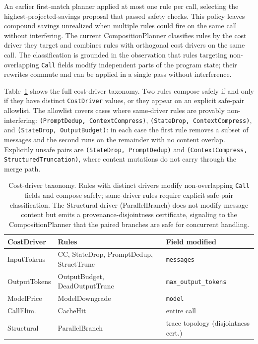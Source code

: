 \documentclass[sigconf,9pt]{acmart}
\begin{document}
An earlier first-match planner applied at most one rule per call, selecting the
highest-projected-savings proposal that passed safety checks. This policy leaves
compound savings unrealized when multiple rules could fire on the same call without
interfering. The current CompositionPlanner classifies rules by the cost driver they
target and combines rules with orthogonal cost drivers on the same call. The
classification is grounded in the observation that rules targeting non-overlapping
\texttt{Call} fields modify independent parts of the program state; their rewrites
commute and can be applied in a single pass without interference.

Table~\ref{tab:costdrivers} shows the full cost-driver taxonomy. Two rules compose
safely if and only if they have distinct \texttt{CostDriver} values, or they appear
on an explicit safe-pair allowlist. The allowlist covers cases where same-driver rules
are provably non-interfering: \texttt{(PromptDedup, ContextCompress)},
\texttt{(StateDrop, ContextCompress)}, and \texttt{(StateDrop, OutputBudget)}: in
each case the first rule removes a subset of messages and the second runs on the
remainder with no content overlap. Explicitly unsafe pairs are
\texttt{(StateDrop, PromptDedup)} and \texttt{(ContextCompress,
StructuredTruncation)}, where content mutations do not carry through the merge path.

\begin{table}[t]
\caption{Cost-driver taxonomy. Rules with distinct drivers modify non-overlapping
\texttt{Call} fields and compose safely; same-driver rules require explicit safe-pair
classification. The Structural driver (ParallelBranch) does not modify message content
but emits a provenance-disjointness certificate, signaling to the CompositionPlanner
that the paired branches are safe for concurrent handling.}
\label{tab:costdrivers}
\footnotesize
\begin{tabularx}{\columnwidth}{@{} l l X @{}}
\toprule
CostDriver & Rules & Field modified \\
\midrule
InputTokens  & CC, StateDrop, PromptDedup, StructTrunc & \texttt{messages} \\
OutputTokens & OutputBudget, DeadOutputTrunc & \texttt{max\_output\_tokens} \\
ModelPrice   & ModelDowngrade  & \texttt{model} \\
CallElim.    & CacheHit        & entire call \\
Structural   & ParallelBranch  & trace topology (disjointness cert.) \\
\bottomrule
\end{tabularx}
\end{table}
\end{document}
